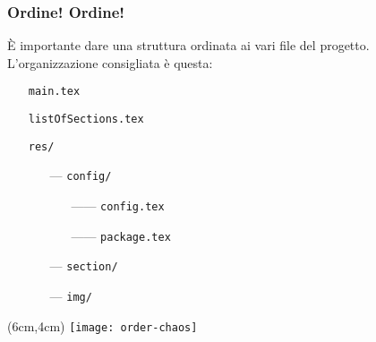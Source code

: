 \begin{frame}
 \frametitle{Ordine! Ordine!}
 
 È importante dare una struttura ordinata ai vari file del progetto.\newline
 L'organizzazione consigliata è questa:
 
 \begin{itemize}
  \item[] \texttt{main.tex}
  \item[] \texttt{listOfSections.tex}
  \item[] \texttt{res/}
  \begin{itemize}
    \item[---] \texttt{config/}
    \begin{itemize}
      \item[------] \texttt{config.tex}
      \item[------] \texttt{package.tex}
    \end{itemize}
    \item[---] \texttt{section/}
    \item[---] \texttt{img/}
  \end{itemize}
 \end{itemize}
 
 
 \begin{textblock*}{5cm}(6cm,4cm)
   \texttt{[image: order-chaos]}
 \end{textblock*}


\end{frame}
